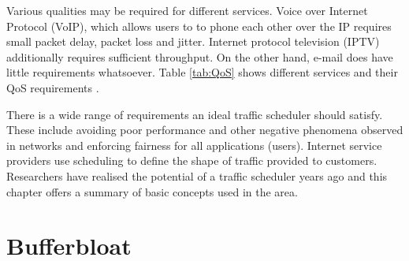 Various qualities may be required for different services. Voice over Internet Protocol (VoIP), which allows users to to phone each other over the IP requires small packet delay, packet loss and jitter. Internet protocol television (IPTV) additionally requires sufficient throughput. On the other hand, e-mail does have little requirements whatsoever. Table \ref{tab:QoS} shows different services and their QoS requirements \cite{Tanenbaum:2002:CN:572404}.

\begin{table}
	\caption{Stringency of services’ quality-of-service requirements.}
	
	\label{tab:QoS}
	\centering
\end{table}


There is a wide range of requirements an ideal traffic scheduler should satisfy. These include avoiding poor performance and other negative phenomena observed in networks and enforcing fairness for all applications (users). Internet service providers use scheduling to define the shape of traffic provided to customers. Researchers have realised the potential of a traffic scheduler years ago and this chapter offers a summary of basic concepts used in the area.



\section{Bufferbloat}
\label{chap:bb}

